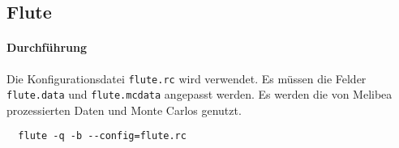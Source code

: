 \subsection{Flute}%
\label{sub:flute}

\paragraph{Durchführung}%

Die Konfigurationsdatei \texttt{flute.rc} wird verwendet.
Es müssen die Felder \texttt{flute.data} und \texttt{flute.mcdata} angepasst werden.
Es werden die von Melibea prozessierten Daten und Monte Carlos genutzt.


\begin{lstlisting}
  flute -q -b --config=flute.rc
\end{lstlisting}
